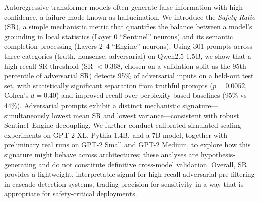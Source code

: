 Autoregressive transformer models often generate false information with high confidence, a failure mode known as hallucination. We introduce the \textit{Safety Ratio} (SR), a simple mechanistic metric that quantifies the balance between a model's grounding in local statistics (Layer 0 ``Sentinel'' neurons) and its semantic completion processing (Layers 2--4 ``Engine'' neurons). Using 301 prompts across three categories (truth, nonsense, adversarial) on Qwen2.5-1.5B, we show that a high-recall SR threshold (SR $< 0.368$, chosen on a validation split as the 95th percentile of adversarial SR) detects 95\% of adversarial inputs on a held-out test set, with statistically significant separation from truthful prompts ($p = 0.0052$, Cohen's $d = 0.40$) and improved recall over perplexity-based baselines (95\% vs 44\%). Adversarial prompts exhibit a distinct mechanistic signature---simultaneously lowest mean SR and lowest variance---consistent with robust Sentinel--Engine decoupling. We further conduct calibrated simulated scaling experiments on GPT-2-XL, Pythia-1.4B, and a 7B model, together with preliminary real runs on GPT-2 Small and GPT-2 Medium, to explore how this signature might behave across architectures; these analyses are hypothesis-generating and do not constitute definitive cross-model validation. Overall, SR provides a lightweight, interpretable signal for high-recall adversarial pre-filtering in cascade detection systems, trading precision for sensitivity in a way that is appropriate for safety-critical deployments.

